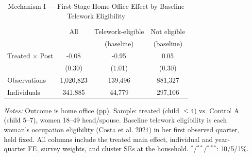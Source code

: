 \begin{table}[htbp]\centering
\caption{Mechanism I --- First-Stage Home-Office Effect by Baseline Telework Eligibility}
\label{tab:mech_moderation}\small
\begin{tabular}{lccc}
\toprule
 & All & Telework-eligible & Not eligible \\
 & & (baseline) & (baseline) \\
\midrule
Treated $\times$ Post & -0.08$^{}$ & -0.95$^{}$ & 0.05$^{}$ \\
 & (0.30) & (1.01) & (0.30) \\
Observations & 1,020,823 & 139,496 & 881,327 \\
Individuals & 341,885 & 44,779 & 297,106 \\
\bottomrule\end{tabular}
\begin{tablenotes}\small
\item \textit{Notes:} Outcome is home office (pp). Sample: treated (child $\leq$4) vs. Control A (child 5--7), women 18--49 head/spouse. Baseline telework eligibility is each woman's occupation eligibility (Costa et al. 2024) in her first observed quarter, held fixed. All columns include the treated main effect, individual and year-quarter FE, survey weights, and cluster SEs at the household. $^{*}$/$^{**}$/$^{***}$: 10/5/1\%.
\end{tablenotes}\end{table}
